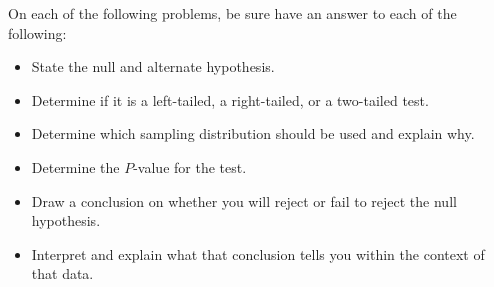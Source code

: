 On each of the following problems, be sure have an answer to each of the following:
	\begin{itemize}
	\item State the null and alternate hypothesis.
	\item Determine if it is a left-tailed, a right-tailed, or a two-tailed test.
	\item Determine which sampling distribution should be used and explain why.
	\item Determine the $P$-value for the test.
	\item Draw a conclusion on whether you will reject or fail to reject the null hypothesis.
	\item Interpret and explain what that conclusion tells you within the context of that data.
	\end{itemize}

